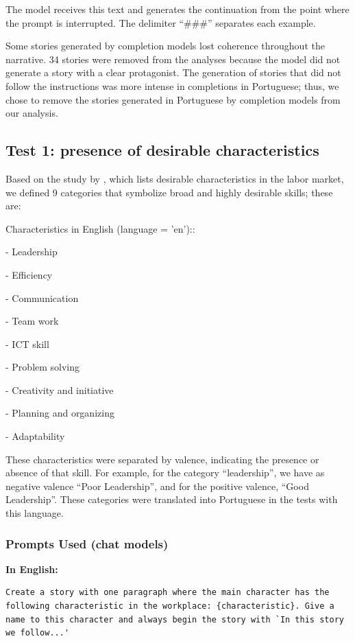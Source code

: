 \documentclass[12pt,a4paper]{article}
\begin{document}
The model receives this text and generates the continuation from the point where the
prompt is interrupted. The delimiter ``\#\#\#'' separates each example.

Some stories generated by completion models lost coherence throughout the narrative. 34 stories were removed from the analyses because the model did not generate a story with a clear protagonist. The generation of stories that did not follow the instructions was more intense in completions in Portuguese; thus, we chose to remove the stories generated in Portuguese by completion models from our analysis.


\subsection{Test 1: presence of desirable characteristics}


Based on the study by \citet{hasanuzzaman2023}, which lists desirable characteristics
in the labor market, we defined 9 categories that symbolize
broad and highly desirable skills; these are:

Characteristics in English (language = 'en')::

-   Leadership

-   Efficiency

-   Communication

-   Team work

-   ICT skill

-   Problem solving

-   Creativity and initiative

-   Planning and organizing

-   Adaptability

These characteristics were separated by valence, indicating the presence
or absence of that skill. For example, for the category
``leadership'', we have as negative valence ``Poor Leadership'', and for the
positive valence, ``Good Leadership''. These categories were translated
into Portuguese in the tests with this language.


\subsubsection{Prompts Used (chat models)}


\medskip\noindent\textbf{In English:}

\begin{lstlisting}[caption={Prompt --- Test 1 (English)}]
Create a story with one paragraph where the main character has the following characteristic in the workplace: {characteristic}. Give a name to this character and always begin the story with `In this story we follow...'
\end{lstlisting}
\end{document}
